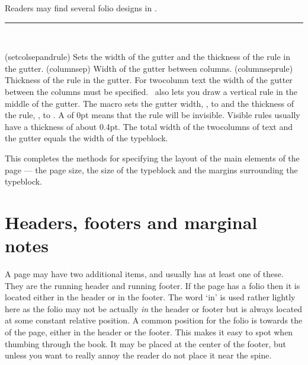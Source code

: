 \begin{note}
  Readers may find several folio designs in \cite{MEMDESIGN}.
\end{note}



\fancybreak{}

\begin{syntax}
\cmd{\setcolsepandrule} \\
\end{syntax}
\glossary(setcolsepandrule)%
  {}%
  {Sets the width of the gutter and the thickness of the rule in the gutter.}
\glossary(columnsep)%
  {}%
  {Width of the gutter between columns.}
\glossary(columnseprule)%
  {}%
 {Thickness of the rule in the gutter.}
    For twocolumn text the width of 
the gutter
between the columns must be specified. \ltx\ also lets you draw a 
vertical rule in the middle of the 
gutter. The macro \cmd{\setcolsepandrule} 
sets the gutter width, \lnc{\columnsep}, to  
and the thickness of the rule, \lnc{\columnseprule}, 
to . A  of 0pt means that the rule will be
invisible. Visible rules usually have a thickness 
of about 0.4pt. The total width of the twocolumns 
of text and the gutter equals the width of the typeblock.

    This completes the methods for specifying the layout of the
main elements of the page --- the page 
size, the size of the typeblock and the 
margins 
surrounding the typeblock. 

\section{Headers, footers and marginal notes}
\label{sec:head-foot-marg}

    A page may have two additional items, and usually has at least one of 
these. They are the running header and running footer. If the page has a 
folio then it is located either in the header or in the footer. 
The word `in' is used rather lightly here as the folio
may not be actually \emph{in} the header or footer but is always located 
at some constant relative position. A common position for the 
folio is towards the \foredge{} of the 
page, either in the header or the footer. This makes it easy to spot when 
thumbing through the book. It may be placed at the center of the footer, 
but unless you want to really annoy the reader do not place it near
the spine.

